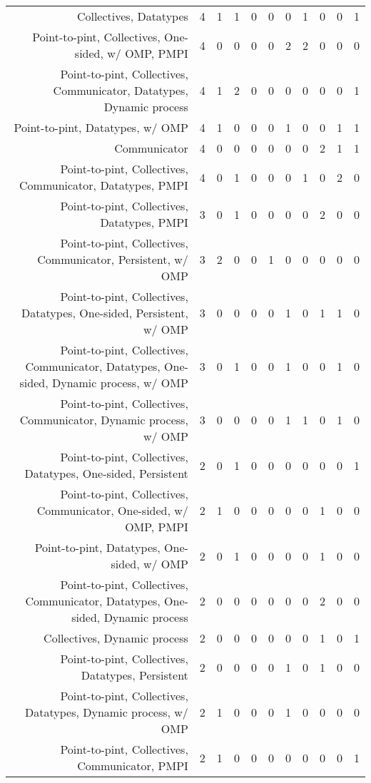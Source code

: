 {\begin{landscape}
\begin{longtable}[htb]{r|c|c|c|c|c|c|c|c|c|c}
{Collectives, Datatypes} & 4 & 1 & 1 & 0 & 0 & 0 & 1 & 0 & 0 & 1 \\%
{Point-to-pint, Collectives, One-sided, w/ OMP, PMPI} & 4 & 0 & 0 & 0 & 0 & 2 & 2 & 0 & 0 & 0 \\%
{Point-to-pint, Collectives, Communicator, Datatypes, Dynamic process} & 4 & 1 & 2 & 0 & 0 & 0 & 0 & 0 & 0 & 1 \\%
{Point-to-pint, Datatypes, w/ OMP} & 4 & 1 & 0 & 0 & 0 & 1 & 0 & 0 & 1 & 1 \\%
{Communicator} & 4 & 0 & 0 & 0 & 0 & 0 & 0 & 2 & 1 & 1 \\%
{Point-to-pint, Collectives, Communicator, Datatypes, PMPI} & 4 & 0 & 1 & 0 & 0 & 0 & 1 & 0 & 2 & 0 \\%
{Point-to-pint, Collectives, Datatypes, PMPI} & 3 & 0 & 1 & 0 & 0 & 0 & 0 & 2 & 0 & 0 \\%
{Point-to-pint, Collectives, Communicator, Persistent, w/ OMP} & 3 & 2 & 0 & 0 & 1 & 0 & 0 & 0 & 0 & 0 \\%
{Point-to-pint, Collectives, Datatypes, One-sided, Persistent, w/ OMP} & 3 & 0 & 0 & 0 & 0 & 1 & 0 & 1 & 1 & 0 \\%
{Point-to-pint, Collectives, Communicator, Datatypes, One-sided, Dynamic process, w/ OMP} & 3 & 0 & 1 & 0 & 0 & 1 & 0 & 0 & 1 & 0 \\%
{Point-to-pint, Collectives, Communicator, Dynamic process, w/ OMP} & 3 & 0 & 0 & 0 & 0 & 1 & 1 & 0 & 1 & 0 \\%
{Point-to-pint, Collectives, Datatypes, One-sided, Persistent} & 2 & 0 & 1 & 0 & 0 & 0 & 0 & 0 & 0 & 1 \\%
{Point-to-pint, Collectives, Communicator, One-sided, w/ OMP, PMPI} & 2 & 1 & 0 & 0 & 0 & 0 & 0 & 1 & 0 & 0 \\%
{Point-to-pint, Datatypes, One-sided, w/ OMP} & 2 & 0 & 1 & 0 & 0 & 0 & 0 & 1 & 0 & 0 \\%
{Point-to-pint, Collectives, Communicator, Datatypes, One-sided, Dynamic process} & 2 & 0 & 0 & 0 & 0 & 0 & 0 & 2 & 0 & 0 \\%
{Collectives, Dynamic process} & 2 & 0 & 0 & 0 & 0 & 0 & 0 & 1 & 0 & 1 \\%
{Point-to-pint, Collectives, Datatypes, Persistent} & 2 & 0 & 0 & 0 & 0 & 1 & 0 & 1 & 0 & 0 \\%
{Point-to-pint, Collectives, Datatypes, Dynamic process, w/ OMP} & 2 & 1 & 0 & 0 & 0 & 1 & 0 & 0 & 0 & 0 \\%
{Point-to-pint, Collectives, Communicator, PMPI} & 2 & 1 & 0 & 0 & 0 & 0 & 0 & 0 & 0 & 1 \\%

\end{longtable}
\end{landscape}}
